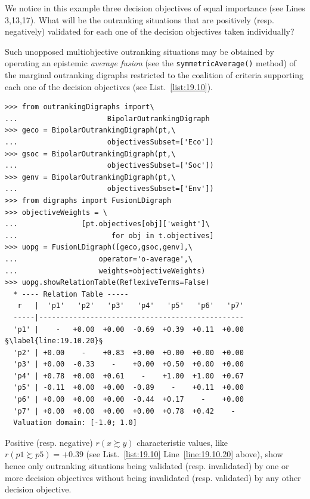 We notice in this example three decision objectives of equal importance (see Lines 3,13,17). What will be the outranking situations that are positively (resp.  negatively) validated for each one of the decision objectives taken individually?

Such unopposed multiobjective outranking situations may be obtained by operating an epistemic \emph{average fusion} (see the \texttt{symmetricAverage()} method) of the marginal outranking digraphs restricted to the coalition of criteria supporting each one of the decision objectives (see List.~\vref{list:19.10}).
\begin{lstlisting}[caption={Computing unopposed outranking situations},label=list:19.10]
>>> from outrankingDigraphs import\
...                     BipolarOutrankingDigraph
>>> geco = BipolarOutrankingDigraph(pt,\
...                     objectivesSubset=['Eco'])
>>> gsoc = BipolarOutrankingDigraph(pt,\
...                     objectivesSubset=['Soc'])
>>> genv = BipolarOutrankingDigraph(pt,\
...                     objectivesSubset=['Env'])
>>> from digraphs import FusionLDigraph
>>> objectiveWeights = \
...               [pt.objectives[obj]['weight']\
...                      for obj in t.objectives] 
>>> uopg = FusionLDigraph([geco,gsoc,genv],\
...                   operator='o-average',\
...                   weights=objectiveWeights)
>>> uopg.showRelationTable(ReflexiveTerms=False)
  * ---- Relation Table -----
   r   |  'p1'   'p2'   'p3'   'p4'   'p5'   'p6'   'p7'   
  -----|------------------------------------------------
  'p1' |    -   +0.00  +0.00  -0.69  +0.39  +0.11  +0.00  §\label{line:19.10.20}§
  'p2' | +0.00    -    +0.83  +0.00  +0.00  +0.00  +0.00  
  'p3' | +0.00  -0.33    -    +0.00  +0.50  +0.00  +0.00  
  'p4' | +0.78  +0.00  +0.61    -    +1.00  +1.00  +0.67  
  'p5' | -0.11  +0.00  +0.00  -0.89    -    +0.11  +0.00  
  'p6' | +0.00  +0.00  +0.00  -0.44  +0.17    -    +0.00  
  'p7' | +0.00  +0.00  +0.00  +0.00  +0.78  +0.42    -   
  Valuation domain: [-1.0; 1.0]
\end{lstlisting}

Positive (resp. negative) $r(x \succsim y)$ characteristic values, like $r(p1 \succsim p5) = +0.39$ (see List.~\ref{list:19.10} Line~\ref{line:19.10.20} above), show hence only outranking situations being validated (resp. invalidated) by one or more decision objectives without being invalidated (resp. validated) by any other decision objective.

